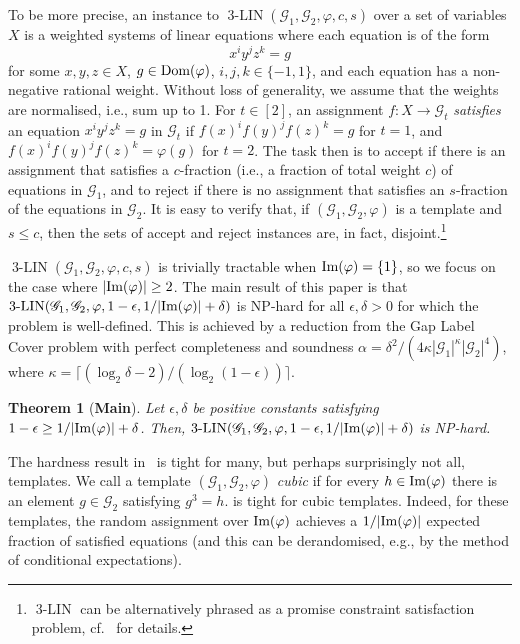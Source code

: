 \documentclass[a4paper,11pt]{article}
\newtheorem{theorem}{Theorem}[section]
\theoremstyle{definition}
\newcommand{\gr}{\mathscr{G}}
\newcommand{\im}{\textnormal{Im}}
\newcommand{\dom}{\textnormal{Dom}}
\newcommand{\groupid}{1}
\newcommand{\eq}{\ensuremath{\operatorname{3-LIN}}}
\begin{document}
To be more precise, an instance to  $\eq(\gr_1, \gr_2, \varphi,c,s)$ over a set of variables $X$ is a weighted systems of linear equations where each equation is of the form \[x^i y^j z^k = g\] for some $x,y,z \in X$, $g \in \dom(\varphi)$,  $i,j,k \in \{-1,1\}$, and each equation has a non-negative rational weight. Without loss of generality, we assume that the weights are normalised, i.e., sum up to 1.
For $t \in [2]$, an assignment $f:X\to \gr_t$ \emph{satisfies} an equation  $x^i y^j z^k = g$ in $\gr_t$ if $f(x)^i f(y)^j f(z)^k = g$ for $t=1$, and $f(x)^i f(y)^j f(z)^k = \varphi(g)$ for $t=2$.
The task then is to accept if there is an assignment that satisfies a $c$-fraction (i.e., a fraction of total weight $c$) of equations in $\gr_1$, and to reject if there is no assignment that satisfies an $s$-fraction of the equations in $\gr_2$. It is easy to verify that, if $(\gr_1,\gr_2, \varphi)$ is a template and $s \leq c$, then the sets of accept and reject instances are, in fact, disjoint.\footnote{$\eq$ can be alternatively phrased as a promise constraint satisfaction problem, cf.~ for details.}




$\eq(\gr_1,\gr_2,\varphi,c,s)$ is trivially tractable when $\im(\varphi)=\{\groupid\}$, so we focus on the case where $|\im(\varphi)|\geq 2$.
The main result of this paper is that $\eq(\gr_1,\gr_2,\varphi,1-\epsilon,1/|\im(\varphi)|+\delta)$ is NP-hard for all $\epsilon, \delta>0$ for which the problem is well-defined. This is achieved by a reduction from the Gap Label Cover problem with perfect completeness and soundness $\alpha=\delta^2/(4\kappa|\gr_1|^\kappa|\gr_2|^{4})$, where $\kappa=\lceil(\log_2\delta -2)/(\log_2(1-\epsilon))\rceil$. 
\begin{theorem}[\textbf{Main}]
\label{th:main}
     Let $\epsilon, \delta$ be positive constants satisfying $1-\epsilon
     \geq1/|\im(\varphi)|+\delta$. Then, $\eq(\gr_1,\gr_2,\varphi,1-\epsilon,1/|\im(\varphi)|+\delta)$ is NP-hard.
\end{theorem}
The hardness result in~ is tight for many, but perhaps surprisingly not all, templates. 
We call a template $(\gr_1,\gr_2, \varphi)$
\emph{cubic} if for every $h\in \im(\varphi)$ there is an element $g\in \gr_2$ satisfying $g^3=h$.
 is tight for cubic templates. Indeed, for these templates, the random assignment over $\im(\varphi)$ achieves a $1/|\im(\varphi)|$ expected
fraction of satisfied equations (and this can be derandomised, e.g., by the
method of conditional expectations). \par
\end{document}
